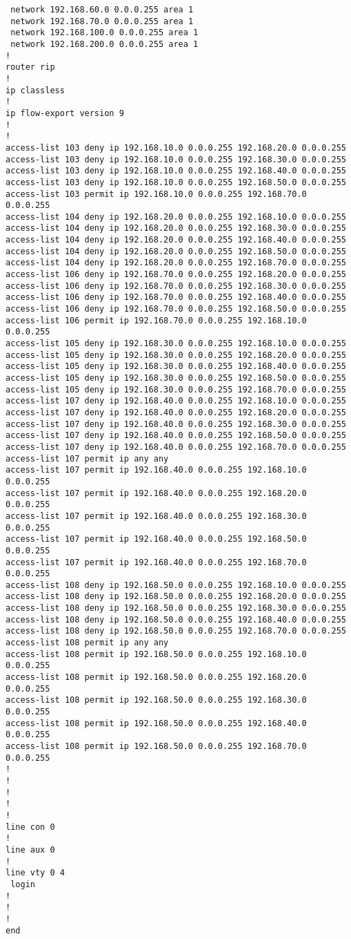 \documentclass[a4paper,onecolumn,11pt]{article}
\begin{document}
{\begin{verbatim}
 network 192.168.60.0 0.0.0.255 area 1
 network 192.168.70.0 0.0.0.255 area 1
 network 192.168.100.0 0.0.0.255 area 1
 network 192.168.200.0 0.0.0.255 area 1
!
router rip
!
ip classless
!
ip flow-export version 9
!
!
access-list 103 deny ip 192.168.10.0 0.0.0.255 192.168.20.0 0.0.0.255
access-list 103 deny ip 192.168.10.0 0.0.0.255 192.168.30.0 0.0.0.255
access-list 103 deny ip 192.168.10.0 0.0.0.255 192.168.40.0 0.0.0.255
access-list 103 deny ip 192.168.10.0 0.0.0.255 192.168.50.0 0.0.0.255
access-list 103 permit ip 192.168.10.0 0.0.0.255 192.168.70.0 0.0.0.255
access-list 104 deny ip 192.168.20.0 0.0.0.255 192.168.10.0 0.0.0.255
access-list 104 deny ip 192.168.20.0 0.0.0.255 192.168.30.0 0.0.0.255
access-list 104 deny ip 192.168.20.0 0.0.0.255 192.168.40.0 0.0.0.255
access-list 104 deny ip 192.168.20.0 0.0.0.255 192.168.50.0 0.0.0.255
access-list 104 deny ip 192.168.20.0 0.0.0.255 192.168.70.0 0.0.0.255
access-list 106 deny ip 192.168.70.0 0.0.0.255 192.168.20.0 0.0.0.255
access-list 106 deny ip 192.168.70.0 0.0.0.255 192.168.30.0 0.0.0.255
access-list 106 deny ip 192.168.70.0 0.0.0.255 192.168.40.0 0.0.0.255
access-list 106 deny ip 192.168.70.0 0.0.0.255 192.168.50.0 0.0.0.255
access-list 106 permit ip 192.168.70.0 0.0.0.255 192.168.10.0 0.0.0.255
access-list 105 deny ip 192.168.30.0 0.0.0.255 192.168.10.0 0.0.0.255
access-list 105 deny ip 192.168.30.0 0.0.0.255 192.168.20.0 0.0.0.255
access-list 105 deny ip 192.168.30.0 0.0.0.255 192.168.40.0 0.0.0.255
access-list 105 deny ip 192.168.30.0 0.0.0.255 192.168.50.0 0.0.0.255
access-list 105 deny ip 192.168.30.0 0.0.0.255 192.168.70.0 0.0.0.255
access-list 107 deny ip 192.168.40.0 0.0.0.255 192.168.10.0 0.0.0.255
access-list 107 deny ip 192.168.40.0 0.0.0.255 192.168.20.0 0.0.0.255
access-list 107 deny ip 192.168.40.0 0.0.0.255 192.168.30.0 0.0.0.255
access-list 107 deny ip 192.168.40.0 0.0.0.255 192.168.50.0 0.0.0.255
access-list 107 deny ip 192.168.40.0 0.0.0.255 192.168.70.0 0.0.0.255
access-list 107 permit ip any any
access-list 107 permit ip 192.168.40.0 0.0.0.255 192.168.10.0 0.0.0.255
access-list 107 permit ip 192.168.40.0 0.0.0.255 192.168.20.0 0.0.0.255
access-list 107 permit ip 192.168.40.0 0.0.0.255 192.168.30.0 0.0.0.255
access-list 107 permit ip 192.168.40.0 0.0.0.255 192.168.50.0 0.0.0.255
access-list 107 permit ip 192.168.40.0 0.0.0.255 192.168.70.0 0.0.0.255
access-list 108 deny ip 192.168.50.0 0.0.0.255 192.168.10.0 0.0.0.255
access-list 108 deny ip 192.168.50.0 0.0.0.255 192.168.20.0 0.0.0.255
access-list 108 deny ip 192.168.50.0 0.0.0.255 192.168.30.0 0.0.0.255
access-list 108 deny ip 192.168.50.0 0.0.0.255 192.168.40.0 0.0.0.255
access-list 108 deny ip 192.168.50.0 0.0.0.255 192.168.70.0 0.0.0.255
access-list 108 permit ip any any
access-list 108 permit ip 192.168.50.0 0.0.0.255 192.168.10.0 0.0.0.255
access-list 108 permit ip 192.168.50.0 0.0.0.255 192.168.20.0 0.0.0.255
access-list 108 permit ip 192.168.50.0 0.0.0.255 192.168.30.0 0.0.0.255
access-list 108 permit ip 192.168.50.0 0.0.0.255 192.168.40.0 0.0.0.255
access-list 108 permit ip 192.168.50.0 0.0.0.255 192.168.70.0 0.0.0.255
!
!
!
!
!
line con 0
!
line aux 0
!
line vty 0 4
 login
!
!
!
end
\end{verbatim}
}
\end{document}
